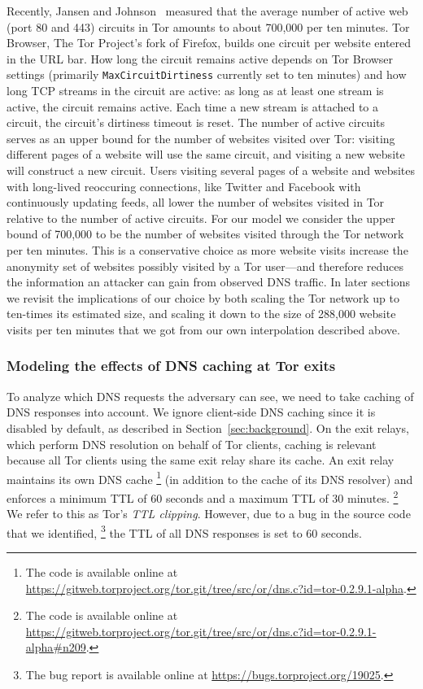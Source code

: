Recently, Jansen and Johnson~\cite{Jansen2016a} measured that the average number
of active web (port 80 and 443) circuits in Tor amounts to about 700,000 per ten
minutes.
Tor Browser, The Tor Project's fork of Firefox, builds one circuit per
website entered in the URL bar. How long the circuit remains active depends on
Tor Browser settings (primarily {\tt MaxCircuitDirtiness} currently set to ten
minutes) and how long TCP streams in the circuit are active: as long as at
least one stream is active, the circuit remains active.  Each time a new stream
is attached to a circuit, the circuit's dirtiness timeout is reset.
The number of active circuits serves as an
upper bound for the number of websites visited over Tor: visiting different
pages of a website will use the same circuit, and visiting a new website will
construct a new circuit.  Users visiting several pages of a website and websites
with long-lived reoccuring connections, like Twitter and Facebook with
continuously updating feeds,
all lower the number of websites visited in Tor relative to the number of active
circuits.
For our model we consider the upper bound of 700,000 to be the number
of websites visited through the Tor network per ten minutes. This is a
conservative choice as more website visits increase the anonymity set of
websites possibly visited by a Tor user---and therefore reduces the
information an attacker can gain from observed DNS traffic.
In later sections we revisit the implications of our choice by both
scaling the Tor network up to ten-times its estimated size, and scaling
it down to the size of 288,000 website visits per ten minutes that we
got from our own interpolation described above.

\subsubsection{Modeling the effects of DNS caching at Tor exits}
To analyze which DNS requests the adversary can see, we need to
take caching of DNS responses into account. We ignore client-side DNS
caching since it is disabled by default, as described in
Section~\ref{sec:background}.
On the exit relays, which perform DNS resolution on behalf of Tor clients,
caching is relevant because all Tor clients using the same exit relay share its
cache.  An exit relay maintains its own DNS cache%
\footnote{The code is available online at \url{https://gitweb.torproject.org/tor.git/tree/src/or/dns.c?id=tor-0.2.9.1-alpha}.}
(in addition to the cache of its DNS resolver) and enforces a minimum TTL of 60
seconds and a maximum TTL of 30 minutes.%
\footnote{The code is available online at \url{https://gitweb.torproject.org/tor.git/tree/src/or/dns.c?id=tor-0.2.9.1-alpha\#n209}.}
We refer to this as Tor's \emph{TTL clipping}. However, due to a bug in the
source code that we identified,%
\footnote{The bug report is available online at \url{https://bugs.torproject.org/19025}.}
the TTL of all DNS responses is set to 60 seconds.

